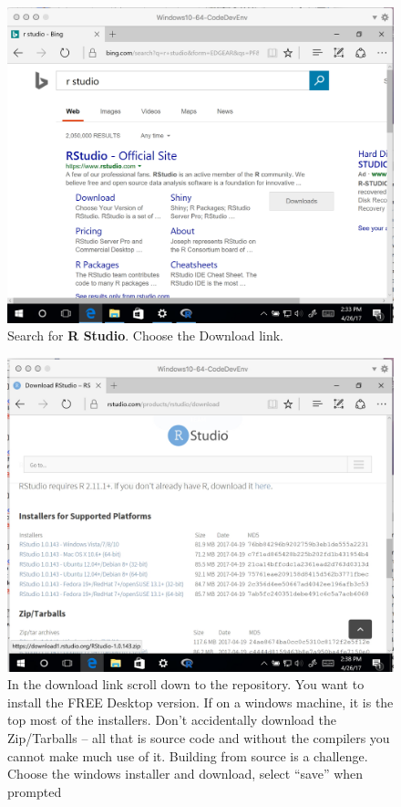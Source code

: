 \begin{figure}[h!] %
   \centering
   \includegraphics[width=4.5in]{./1-Introduction/downloading.jpg} 
   \caption{Search for \textbf{R Studio}.  Choose the Download link.}
\end{figure}

\begin{figure}[h!] %
   \centering
   \includegraphics[width=4.5in]{./1-Introduction/runInstall.jpg} 
   \caption{In the download link scroll down to the repository.  You want to install the FREE Desktop version.  If on a windows machine, it is the top most of the installers.  Don't accidentally download the Zip/Tarballs -- all that is source code and without the compilers you cannot make much use of it.  Building from source is a challenge.  Choose the windows installer and download, select ``save'' when prompted}
\end{figure}

